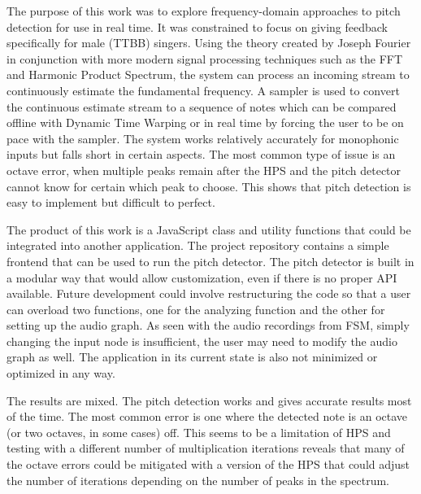 The purpose of this work was to explore frequency-domain approaches to pitch detection for use in real time. It was constrained to focus on giving feedback specifically for male (TTBB) singers. Using the theory created by Joseph Fourier in conjunction with more modern signal processing techniques such as the FFT and Harmonic Product Spectrum, the system can process an incoming stream to continuously estimate the fundamental frequency. A sampler is used to convert the continuous estimate stream to a sequence of notes which can be compared offline with Dynamic Time Warping or in real time by forcing the user to be on pace with the sampler. The system works relatively accurately for monophonic inputs but falls short in certain aspects. The most common type of issue is an octave error, when multiple peaks remain after the HPS and the pitch detector cannot know for certain which peak to choose. This shows that pitch detection is easy to implement but difficult to perfect. 

The product of this work is a JavaScript class and utility functions that could be integrated into another application. The project repository contains a simple frontend that can be used to run the pitch detector. The pitch detector is built in a modular way that would allow customization, even if there is no proper API available. Future development could involve restructuring the code so that a user can overload two functions, one for the analyzing function and the other for setting up the audio graph. As seen with the audio recordings from FSM, simply changing the input node is insufficient, the user may need to modify the audio graph as well. The application in its current state is also not minimized or optimized in any way.

The results are mixed. The pitch detection works and gives accurate results most of the time. The most common error is one where the detected note is an octave (or two octaves, in some cases) off. This seems to be a limitation of HPS and testing with a different number of multiplication iterations reveals that many of the octave errors could be mitigated with a version of the HPS that could adjust the number of iterations depending on the number of peaks in the spectrum.

